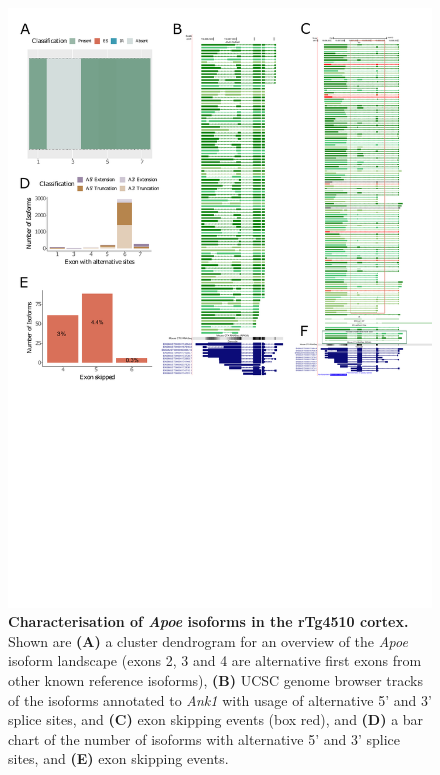 \begin{figure}[htp]
	\centering
	\includegraphics[page=1,trim={0cm 11cm 0 0},scale = 0.85]{Figures/TargetGenes_Annotation_Portrait.pdf}
	\captionsetup{width=0.95\textwidth}
	\caption[Characterisation of the \textit{Apoe} isoform landscape]%
	{\textbf{Characterisation of \textit{Apoe} isoforms in the rTg4510 cortex.} Shown are \textbf{(A)} a cluster dendrogram for an overview of the \textit{Apoe} isoform landscape (exons 2, 3 and 4 are alternative first exons from other known reference isoforms), \textbf{(B)} UCSC genome browser tracks of the isoforms annotated to \textit{Ank1} with usage of alternative 5' and 3' splice sites, and \textbf{(C)} exon skipping events (box red), and \textbf{(D)} a bar chart of the number of isoforms with alternative 5' and 3' splice sites, and \textbf{(E)} exon skipping events.}    
	\label{fig:apoe}
\end{figure}

